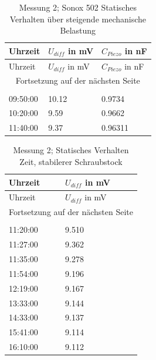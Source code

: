 \documentclass[12pt]{scrreprt} %
\begin{document}
\setlongtables
\begin{longtable}{| l | l | l |}
\hline
Uhrzeit&$U_{diff}$ in mV&$C_{Piezo}$ in nF\\
\hline
\endfirsthead
\hline
Uhrzeit&$U_{diff}$ in mV&$C_{Piezo}$ in nF\\
\hline
\endhead
\hline
\multicolumn{3}{|c|}{Fortsetzung auf der nächsten Seite}\\
\hline
\endfoot
\hline \hline
\caption[Messung 2; Sonox 502 Statisches Verhalten]{Messung 2; Sonox 502 Statisches Verhalten über steigende mechanische Belastung}\\
\endlastfoot
\hline
\label{tab:2.2}%
09:50:00&10.12&0.9734\\
10:20:00&9.59&0.9662\\
11:40:00&9.37&0.96311\\
\end{longtable}

\setlongtables
\begin{longtable}{| l | l |}
\hline
Uhrzeit&$U_{diff}$ in mV\\
\hline
\endfirsthead
\hline
Uhrzeit&$U_{diff}$ in mV\\
\hline
\endhead
\hline
\multicolumn{2}{|c|}{Fortsetzung auf der nächsten Seite}\\
\hline
\endfoot
\hline \hline
\caption[Messung 2; Statisches Verhalten, stabilerer Schraubstock]{Messung 2; Statisches Verhalten Zeit, stabilerer Schraubstock}\\
\endlastfoot
\hline
\label{tab:2.2a}%
11:20:00&9.510\\
11:27:00&9.362\\
11:35:00&9.278\\
11:54:00&9.196\\
12:19:00&9.167\\
13:33:00&9.144\\
14:33:00&9.137\\
15:41:00&9.114\\
16:10:00&9.112\\
\end{longtable}
\end{document}
